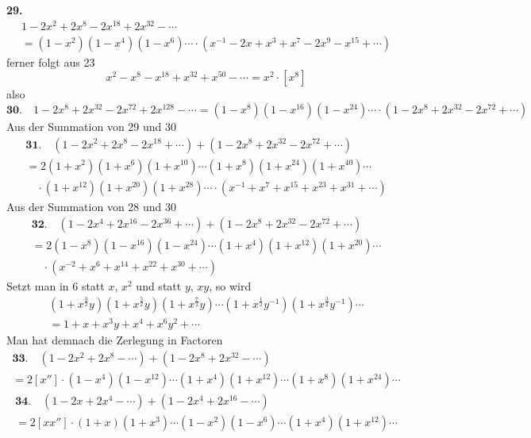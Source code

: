 \documentclass[10pt,a4paper]{article}
\begin{document}
\textbf{29.}
\begin{multline*}
1 - 2x^2 + 2x^8 - 2x^{18} + 2x^{32} - \cdots \\
= (1 - x^2)(1 - x^4)(1 - x^6) \cdots \cdot (x^{-1} - 2x + x^3 + x^7 - 2x^9 - x^{15} + \cdots)
\end{multline*}
%
ferner folgt aus 23
%
\begin{equation*}
x^2 - x^8 - x^{18} + x^{32} + x^{50} - \cdots = x^2 \cdot [x^8]
\end{equation*}
%
also
%
\begin{equation*}
\textbf{30.} \quad 1 - 2x^8 + 2x^{32} - 2x^{72} + 2x^{128} - \cdots =
(1 - x^8)(1 - x^{16})(1 - x^{24}) \cdots \cdot (1 - 2x^8 + 2x^{32} - 2x^{72} + \cdots)
\end{equation*}
%
Aus der Summation von 29 und 30
%
\begin{multline*}
\textbf{31.} \quad (1 - 2x^2 + 2x^8 - 2x^{18} + \cdots) + (1 - 2x^8 + 2x^{32} - 2x^{72} + \cdots) \\
= 2(1 + x^2)(1 + x^6)(1 + x^{10}) \cdots (1 + x^8)(1 + x^{24})(1 + x^{40}) \cdots \\
\quad \cdot (1 + x^{12})(1 + x^{20})(1 + x^{28}) \cdots \cdot (x^{-1} + x^7 + x^{15} + x^{23} + x^{31} + \cdots)
\end{multline*}
%
Aus der Summation von 28 und 30
%
\begin{multline*}
\textbf{32.} \quad (1 - 2x^4 + 2x^{16} - 2x^{36} + \cdots) + (1 - 2x^8 + 2x^{32} - 2x^{72} + \cdots) \\
= 2(1 - x^8)(1 - x^{16})(1 - x^{24}) \cdots (1 + x^4)(1 + x^{12})(1 + x^{20}) \cdots \\
\quad \cdot (x^{-2} + x^6 + x^{14} + x^{22} + x^{30} + \cdots)
\end{multline*}
%
Setzt man in 6 statt $x$, $x^2$ und statt $y$, $xy$, so wird
%
\begin{gather*}
(1 + x^{\frac{3}{2}}y)(1 + x^{\frac{5}{2}}y)(1 + x^{\frac{7}{2}}y) \cdots (1 + x^{\frac{1}{2}}y^{-1})(1 + x^{\frac{3}{2}}y^{-1}) \cdots \\
= 1 + x + x^3y + x^4 + x^6y^2 + \cdots
\end{gather*}
%
Man hat demnach die Zerlegung in Factoren
%
\begin{multline*}
\textbf{33.} \quad (1 - 2x^2 + 2x^8 - \cdots) + (1 - 2x^8 + 2x^{32} - \cdots) \\
= 2[x''] \cdot (1 - x^4)(1 - x^{12}) \cdots (1 + x^4)(1 + x^{12}) \cdots (1 + x^8)(1 + x^{24}) \cdots
\end{multline*}
%
\begin{multline*}
\textbf{34.} \quad (1 - 2x + 2x^4 - \cdots) + (1 - 2x^4 + 2x^{16} - \cdots) \\
= 2[xx''] \cdot (1 + x)(1 + x^3) \cdots (1 - x^2)(1 - x^6) \cdots (1 + x^4)(1 + x^{12}) \cdots
\end{multline*}
\end{document}
